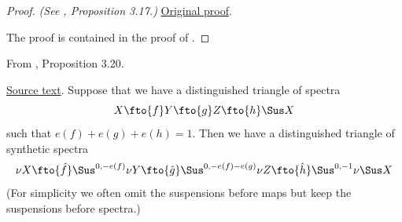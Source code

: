 \begin{proof}
\textit{(See \cite{LWX126}, Proposition 3.17.)} \href{paper/main.tex.html#L938}{Original proof}.

The proof is contained in the proof of \cite[Lemma 9.15]{BHS}.
\end{proof}

\begin{proposition}
\label{paper:3.20}
From \cite{LWX126}, Proposition 3.20.\par

\href{paper/main.tex.html#L965}{Source text}.
Suppose that we have a distinguished triangle of spectra
    $$X\fto{f} Y\fto{g} Z\fto{h} \Sus X$$
    such that $e(f)+e(g)+e(h)=1$. Then we have a distinguished triangle of synthetic spectra
    $$\nu X\fto{\hat f} \Sus^{0,-e(f)}\nu Y\fto{\hat g} \Sus^{0,-e(f)-e(g)}\nu Z\fto{\hat h} \Sus^{0,-1}\nu \Sus X$$
    (For simplicity we often omit the suspensions before maps but keep the suspensions before spectra.)



\sketch
\end{proposition}
